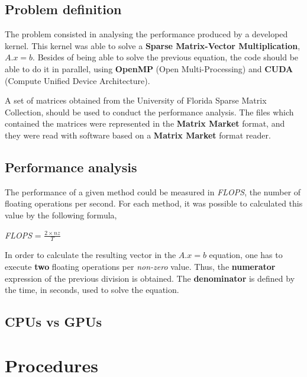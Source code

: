 \documentclass[12pt]{article}
\begin{document}
 
\subsection*{Problem definition}

\par The problem consisted in analysing the performance produced by a developed kernel. This kernel was able to solve a \textbf{Sparse Matrix-Vector Multiplication}, $A.x = b$. Besides of being able to solve the previous equation, the code should be able to do it in parallel, using \textbf{OpenMP} (Open Multi-Processing) and \textbf{CUDA} (Compute Unified Device Architecture).
\par A set of matrices obtained from the University of Florida Sparse Matrix Collection\cite{sparse-matrices}, should be used to conduct the performance analysis. The files which contained the matrices were represented in the \textbf{Matrix Market} format, and they were read with software based on a \textbf{Matrix Market} format reader. \cite{matrix-reader} 

\subsection*{Performance analysis}

\par The performance of a given method could be measured in \textit{FLOPS}, the number of floating operations per second. For each method, it was possible to calculated this value by the following formula,

\begin{center}
\large
\textit{FLOPS} = 
\huge
$
\frac{2 \times nz}{T}
$
\end{center}

In order to calculate the resulting vector in the $A.x = b$ equation, one has to execute \textbf{two} floating operations per \textit{non-zero} value. Thus, the \textbf{numerator} expression of the previous division is obtained. The \textbf{denominator} is defined by the time, in seconds, used to solve the equation.

\subsection*{CPUs vs GPUs}


\section*{Procedures}
\end{document}
